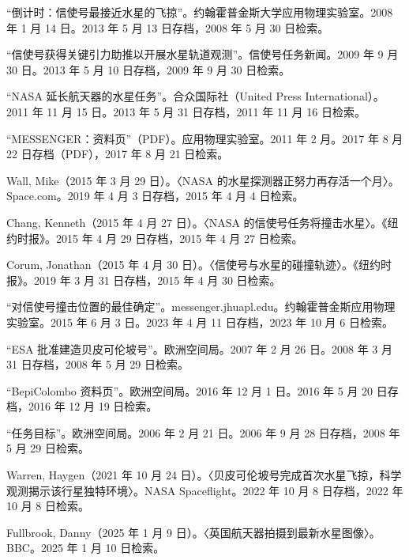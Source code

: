 \begin{enumerate}
“倒计时：信使号最接近水星的飞掠”。约翰霍普金斯大学应用物理实验室。2008 年 1 月 14 日。2013 年 5 月 13 日存档，2008 年 5 月 30 日检索。

“信使号获得关键引力助推以开展水星轨道观测”。信使号任务新闻。2009 年 9 月 30 日。2013 年 5 月 10 日存档，2009 年 9 月 30 日检索。

“NASA 延长航天器的水星任务”。合众国际社（United Press International）。2011 年 11 月 15 日。2013 年 5 月 31 日存档，2011 年 11 月 16 日检索。

“MESSENGER：资料页”（PDF）。应用物理实验室。2011 年 2 月。2017 年 8 月 22 日存档（PDF），2017 年 8 月 21 日检索。

Wall, Mike（2015 年 3 月 29 日）。〈NASA 的水星探测器正努力再存活一个月〉。Space.com。2019 年 4 月 3 日存档，2015 年 4 月 4 日检索。

Chang, Kenneth（2015 年 4 月 27 日）。〈NASA 的信使号任务将撞击水星〉。《纽约时报》。2015 年 4 月 29 日存档，2015 年 4 月 27 日检索。

Corum, Jonathan（2015 年 4 月 30 日）。〈信使号与水星的碰撞轨迹〉。《纽约时报》。2019 年 3 月 31 日存档，2015 年 4 月 30 日检索。

“对信使号撞击位置的最佳确定”。messenger.jhuapl.edu。约翰霍普金斯应用物理实验室。2015 年 6 月 3 日。2023 年 4 月 11 日存档，2023 年 10 月 6 日检索。

“ESA 批准建造贝皮可伦坡号”。欧洲空间局。2007 年 2 月 26 日。2008 年 3 月 31 日存档，2008 年 5 月 29 日检索。

“BepiColombo 资料页”。欧洲空间局。2016 年 12 月 1 日。2016 年 5 月 20 日存档，2016 年 12 月 19 日检索。

“任务目标”。欧洲空间局。2006 年 2 月 21 日。2006 年 9 月 28 日存档，2008 年 5 月 29 日检索。

Warren, Haygen（2021 年 10 月 24 日）。〈贝皮可伦坡号完成首次水星飞掠，科学观测揭示该行星独特环境〉。NASA Spaceflight。2022 年 10 月 8 日存档，2022 年 10 月 8 日检索。

Fullbrook, Danny（2025 年 1 月 9 日）。〈英国航天器拍摄到最新水星图像〉。BBC。2025 年 1 月 10 日检索。

\end{enumerate}
